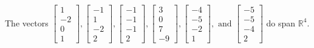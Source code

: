 \begin{exercise}
\begin{exerciseStatement}
  \end{exerciseStatement}
  \begin{exerciseAnswer}
   The vectors \(\left[\begin{array}{r}
1 \\
-2 \\
0 \\
1
\end{array}\right] , \left[\begin{array}{r}
-1 \\
1 \\
-2 \\
2
\end{array}\right] , \left[\begin{array}{r}
-1 \\
-1 \\
-1 \\
2
\end{array}\right] , \left[\begin{array}{r}
3 \\
0 \\
7 \\
-9
\end{array}\right] , \left[\begin{array}{r}
-4 \\
-5 \\
-2 \\
1
\end{array}\right] , \text{ and } \left[\begin{array}{r}
-5 \\
-5 \\
-4 \\
2
\end{array}\right]\) 
  	 do  
	span \(\mathbb{R}^4\).
  


  \end{exerciseAnswer}
\end{exercise}